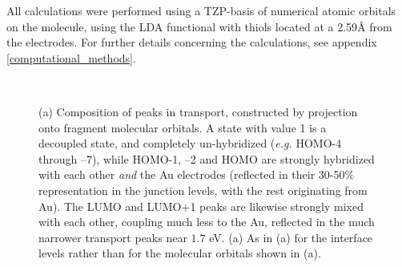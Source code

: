 \documentclass[aip,jcp,a4paper,reprint,floatfix,superscriptaddress]{revtex4-1}
\newcommand{\eg}{\emph{e.g.}\xspace}
\begin{document}
All calculations were performed using a TZP-basis of numerical atomic orbitals on the molecule, using the LDA functional  with thiols located at a 2.59\AA\xspace from the electrodes. For further details concerning the calculations, see appendix \ref{computational_methods}.\\

\begin{figure}
\\
\caption{(a) Composition of peaks in transport, constructed by projection onto fragment molecular orbitals. A state with value 1 is a decoupled state, and completely un-hybridized (\eg HOMO-4 through --7), while HOMO-1, --2 and HOMO are strongly hybridized with each other \emph{and} the Au electrodes (reflected in their 30-50\% representation in the junction levels, with the rest originating from Au). The LUMO and LUMO+1 peaks are likewise strongly mixed with each other, coupling much less to the Au, reflected in the much narrower transport peaks near $1.7$ eV. (a) As in (a) for the interface levels rather than for the molecular orbitals shown in (a). }\label{peak-compositions}
\end{figure}
\end{document}
